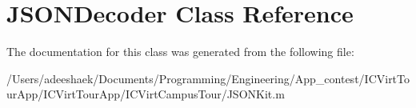 \hypertarget{class_j_s_o_n_decoder}{\section{J\-S\-O\-N\-Decoder Class Reference}
\label{class_j_s_o_n_decoder}
}


The documentation for this class was generated from the following file\-:\begin{DoxyCompactItemize}
\item 
/\-Users/adeeshaek/\-Documents/\-Programming/\-Engineering/\-App\-\_\-contest/\-I\-C\-Virt\-Tour\-App/\-I\-C\-Virt\-Tour\-App/\-I\-C\-Virt\-Campus\-Tour/J\-S\-O\-N\-Kit.\-m\end{DoxyCompactItemize}
